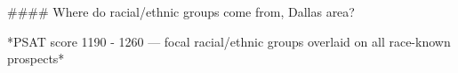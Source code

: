 #### Where do racial/ethnic groups come from, Dallas area?

*PSAT score 1190 - 1260 — focal racial/ethnic groups overlaid on all race-known prospects*
